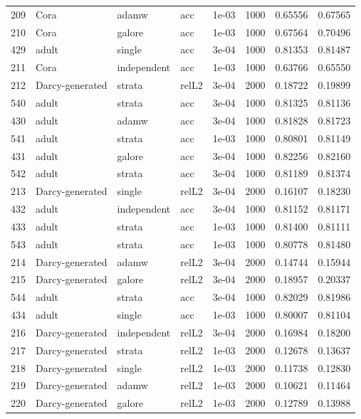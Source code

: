 \begin{longtable}{rlllrrrr}
209 & Cora & adamw & acc & 1e-03 & 1000 & 0.65556 & 0.67565 \\
210 & Cora & galore & acc & 1e-03 & 1000 & 0.67564 & 0.70496 \\
429 & adult & single & acc & 3e-04 & 1000 & 0.81353 & 0.81487 \\
211 & Cora & independent & acc & 1e-03 & 1000 & 0.63766 & 0.65550 \\
\rowcolor{oursbg}
212 & Darcy-generated & strata & relL2 & 3e-04 & 2000 & 0.18722 & 0.19899 \\
540 & adult & strata & acc & 3e-04 & 1000 & 0.81325 & 0.81136 \\
430 & adult & adamw & acc & 3e-04 & 1000 & 0.81828 & 0.81723 \\
\rowcolor{oursbg}
541 & adult & strata & acc & 1e-03 & 1000 & 0.80801 & 0.81149 \\
431 & adult & galore & acc & 3e-04 & 1000 & 0.82256 & 0.82160 \\
\rowcolor{oursbg}
542 & adult & strata & acc & 3e-04 & 1000 & 0.81189 & 0.81374 \\
213 & Darcy-generated & single & relL2 & 3e-04 & 2000 & 0.16107 & 0.18230 \\
432 & adult & independent & acc & 3e-04 & 1000 & 0.81152 & 0.81171 \\
\rowcolor{oursbg}
433 & adult & strata & acc & 1e-03 & 1000 & 0.81400 & 0.81111 \\
543 & adult & strata & acc & 1e-03 & 1000 & 0.80778 & 0.81480 \\
214 & Darcy-generated & adamw & relL2 & 3e-04 & 2000 & 0.14744 & 0.15944 \\
215 & Darcy-generated & galore & relL2 & 3e-04 & 2000 & 0.18957 & 0.20337 \\
\rowcolor{oursbg}
544 & adult & strata & acc & 3e-04 & 1000 & 0.82029 & 0.81986 \\
434 & adult & single & acc & 1e-03 & 1000 & 0.80007 & 0.81104 \\
216 & Darcy-generated & independent & relL2 & 3e-04 & 2000 & 0.16984 & 0.18200 \\
\rowcolor{oursbg}
217 & Darcy-generated & strata & relL2 & 1e-03 & 2000 & 0.12678 & 0.13637 \\
218 & Darcy-generated & single & relL2 & 1e-03 & 2000 & 0.11738 & 0.12830 \\
219 & Darcy-generated & adamw & relL2 & 1e-03 & 2000 & 0.10621 & 0.11464 \\
220 & Darcy-generated & galore & relL2 & 1e-03 & 2000 & 0.12789 & 0.13988 \\

\end{longtable}
